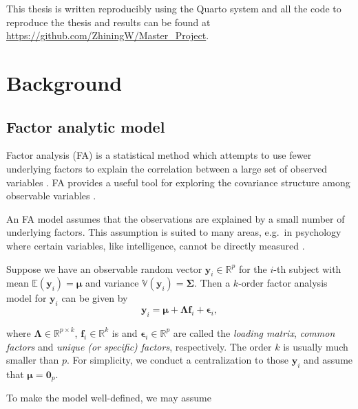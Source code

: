 \documentclass[
  a4paper,
  oneside,
  openany,
  12pt,
  onecolumn,
  twoside]{book}
\theoremstyle{plain}
\theoremstyle{remark}
\begin{document}
This thesis is written reproducibly using the Quarto system
\citep{quarto} and all the code to reproduce the thesis and results can
be found at \url{https://github.com/ZhiningW/Master_Project}.


\chapter{Background}\label{sec-bg}

\section{Factor analytic model}\label{factor-analytic-model}

Factor analysis (FA) is a statistical method which attempts to use fewer
underlying factors to explain the correlation between a large set of
observed variables \citep{mardiaMultivariateAnalysis1979}. FA provides a
useful tool for exploring the covariance structure among observable
variables \citep{hiroseSparseEstimationNonconcave2015}.

An FA model assumes that the observations are explained by a small
number of underlying factors. This assumption is suited to many areas,
e.g.~in psychology where certain variables, like intelligence, cannot be
directly measured \citep{mardiaMultivariateAnalysis1979}.

Suppose we have an observable random vector
\(\boldsymbol{y}_i\in \mathbb{R}^p\) for the \(i\)-th subject with mean
\(\mathbb{E}(\boldsymbol{y}_i)=\boldsymbol{\mu}\) and variance
\(\mathbb{V}(\boldsymbol{y}_i)=\boldsymbol{\Sigma}\). Then a \(k\)-order
factor analysis model for \(\boldsymbol{y}_i\) can be given by \[
\begin{equation}
\boldsymbol{y}_i=\boldsymbol{\mu}+\boldsymbol{\Lambda} \boldsymbol{f}_i+\boldsymbol{\epsilon}_i,
\end{equation} 
\]

where \(\boldsymbol{\Lambda} \in \mathbb{R}^{p \times k}\),
\(\boldsymbol{f}_i \in \mathbb{R}^{k}\) is and
\(\boldsymbol{\epsilon}_i \in \mathbb{R}^{p}\) are called the
\emph{loading matrix}, \emph{common factors} and \emph{unique (or
specific) factors}, respectively. The order \(k\) is usually much
smaller than \(p\). For simplicity, we conduct a centralization to those
\(\boldsymbol{y}_i\) and assume that
\(\boldsymbol{\mu} = \boldsymbol{0}_p\).

To make the model well-defined, we may assume
\end{document}
